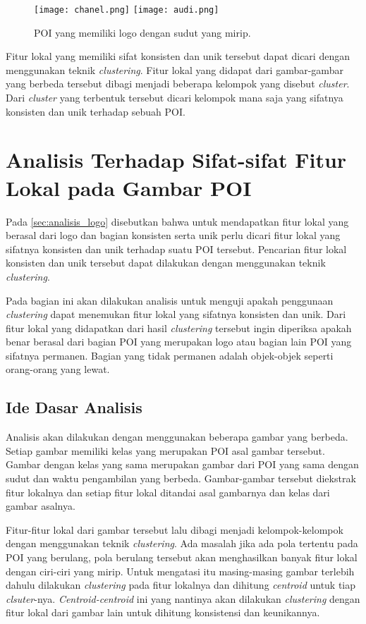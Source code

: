 \begin{figure}[H]
	\centering
	\texttt{[image: chanel.png]}
	\texttt{[image: audi.png]}
	\caption{POI yang memiliki logo dengan sudut yang mirip.}
	\label{fig:logo_tidak_unik}
\end{figure}

Fitur lokal yang memiliki sifat konsisten dan unik tersebut dapat dicari dengan menggunakan teknik \textit{clustering}. Fitur lokal yang didapat dari gambar-gambar yang berbeda tersebut dibagi menjadi beberapa kelompok yang disebut \textit{cluster}. Dari \textit{cluster} yang terbentuk tersebut dicari kelompok mana saja yang sifatnya konsisten dan unik terhadap sebuah POI. 

\section{Analisis Terhadap Sifat-sifat Fitur Lokal pada Gambar POI}
\label{sec:analisis_sifat}
Pada \ref{sec:analisis_logo} disebutkan bahwa untuk mendapatkan fitur lokal yang berasal dari logo dan bagian konsisten serta unik perlu dicari fitur lokal yang sifatnya konsisten dan unik terhadap suatu POI tersebut. Pencarian fitur lokal konsisten dan unik tersebut dapat dilakukan dengan menggunakan teknik \textit{clustering}. 

Pada bagian ini akan dilakukan analisis untuk menguji apakah penggunaan \textit{clustering} dapat menemukan fitur lokal yang sifatnya konsisten dan unik. Dari fitur lokal yang didapatkan dari hasil \textit{clustering} tersebut ingin diperiksa apakah benar berasal dari bagian POI yang merupakan logo atau bagian lain POI yang sifatnya permanen. Bagian yang tidak permanen adalah objek-objek seperti orang-orang yang lewat.

\subsection{Ide Dasar Analisis}
\label{subsec:ide_analisis_clustering}
Analisis akan dilakukan dengan menggunakan beberapa gambar yang berbeda. Setiap gambar memiliki kelas yang merupakan POI asal gambar tersebut. Gambar dengan kelas yang sama merupakan gambar dari POI yang sama dengan sudut dan waktu pengambilan yang berbeda. Gambar-gambar tersebut diekstrak fitur lokalnya dan setiap fitur lokal ditandai asal gambarnya dan kelas dari gambar asalnya. 

Fitur-fitur lokal dari gambar tersebut lalu dibagi menjadi kelompok-kelompok dengan menggunakan teknik \textit{clustering}. Ada masalah jika ada pola tertentu pada POI yang berulang, pola berulang tersebut akan menghasilkan banyak fitur lokal dengan ciri-ciri yang mirip. Untuk mengatasi itu masing-masing gambar terlebih dahulu dilakukan \textit{clustering} pada fitur lokalnya dan dihitung \textit{centroid} untuk tiap \textit{clsuter}-nya. \textit{Centroid-centroid} ini yang nantinya akan dilakukan \textit{clustering} dengan fitur lokal dari gambar lain untuk dihitung konsistensi dan keunikannya.

